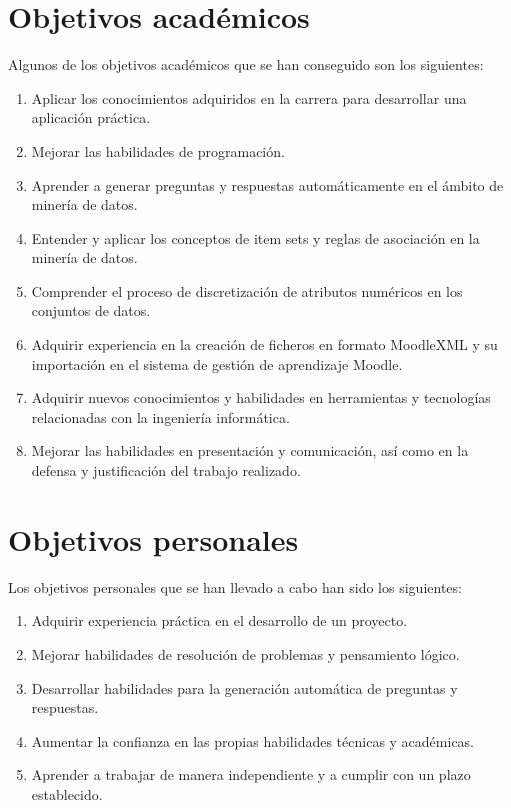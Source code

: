 \section{Objetivos académicos}
Algunos de los objetivos académicos que se han conseguido son los siguientes:

\begin{enumerate}
    \item Aplicar los conocimientos adquiridos en la carrera para desarrollar una aplicación práctica.
    \item Mejorar las habilidades de programación.
    \item Aprender a generar preguntas y respuestas automáticamente en el ámbito de minería de datos.
    \item Entender y aplicar los conceptos de item sets y reglas de asociación en la minería de datos.
    \item Comprender el proceso de discretización de atributos numéricos en los conjuntos de datos.
    \item Adquirir experiencia en la creación de ficheros en formato MoodleXML y su importación en el sistema de gestión de aprendizaje Moodle.
    \item Adquirir nuevos conocimientos y habilidades en herramientas y tecnologías relacionadas con la ingeniería informática.
    \item Mejorar las habilidades en presentación y comunicación, así como en la defensa y justificación del trabajo realizado.
\end{enumerate}

\section{Objetivos personales}
Los objetivos personales que se han llevado a cabo han sido los siguientes:

\begin{enumerate}
    \item Adquirir experiencia práctica en el desarrollo de un proyecto.
    \item Mejorar habilidades de resolución de problemas y pensamiento lógico.
    \item Desarrollar habilidades para la generación automática de preguntas y respuestas.
    \item Aumentar la confianza en las propias habilidades técnicas y académicas.
    \item Aprender a trabajar de manera independiente y a cumplir con un plazo establecido.
\end{enumerate}


